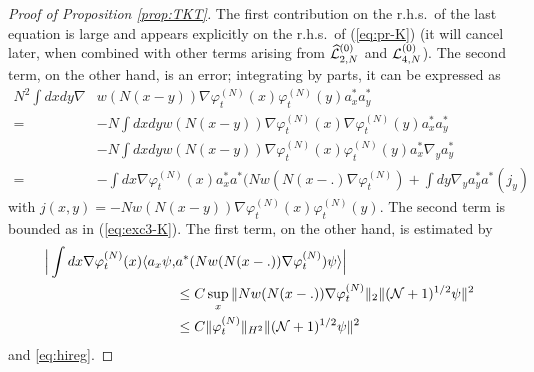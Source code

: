 \documentclass[11pt,a4paper]{article}
\newcommand{\cL}{{\cal L}}
\newcommand{\cN}{{\cal N}}
\newcommand{\ph}{\varphi_t^{(N)}}	%
\begin{document}
\begin{proof}[Proof of Proposition \ref{prop:TKT}]
The first contribution on the r.h.s.\ of the last equation is large and appears explicitly on the r.h.s.\ of (\ref{eq:pr-K}) (it will cancel later, when combined with other terms arising from $\widehat{\cL}^{(0)}_{2,N}$ and $\cL^{(0)}_{4,N}$). The second term, on the other hand, is an error; integrating by parts, it can be expressed as
\[ \begin{split} N^2 \int dx dy \nabla &w (N (x-y)) \nabla \varphi^{(N)}_t (x) \varphi_t^{(N)} (y) a_x^* a_y^* \\ = \; &- N \int dx dy  w (N (x-y)) \nabla \varphi^{(N)}_t (x) \nabla \varphi_t^{(N)} (y) a_x^* a_y^* \\ &- N \int dx dy w (N (x-y)) \nabla \varphi^{(N)}_t (x)  \varphi_t^{(N)} (y) a_x^* \nabla_y a_y^*  \\ = \; &- \int dx \nabla \varphi_t^{(N)} (x) a_x^* a^* (N w(N(x-.) \nabla \varphi_t^{(N)}) + \int dy  \nabla_y a_y^* a^* (j_y) \end{split} \]
with $j(x,y) = -N w(N(x-y)) \nabla\ph(x)\ph(y)$. The second term is bounded as in (\ref{eq:exc3-K}). The first term, on the other hand, is estimated by
\begin{equation}\label{eq:lmK-sp} \begin{split}\Big|   \int dx \nabla \varphi_t^{(N)} (x)  \langle a_x \psi, &a^* (N w(N(x-.)) \nabla \varphi_t^{(N)}) \psi \rangle \Big| \\ &\leq C \sup_x \| N w(N(x-.)) \nabla \varphi_t^{(N)} \|_2 \| (\cN+1)^{1/2} \psi \|^2 \\ &\leq C \| \varphi_t^{(N)} \|_{H^2} \| (\cN+1)^{1/2} \psi \|^2   \end{split} \end{equation} and \eqref{eq:hireg}.


\end{proof}
\end{document}

